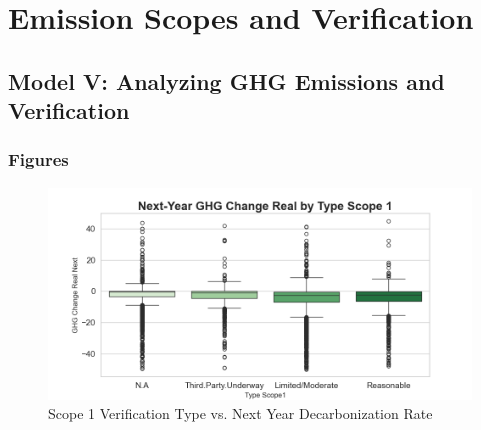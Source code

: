 \section{Emission Scopes and Verification}
\subsection{Model V: Analyzing GHG Emissions and Verification}





\subsubsection{Figures}
\begin{figure}[H]
\centering
  \includegraphics[width=\textwidth]{figures/ghg_change_real_next_by_type_scope1.png}
\caption{Scope 1 Verification Type vs. Next Year Decarbonization Rate}
\label{fig:ghg_change_real_next_by_ghg_type}
\end{figure}

